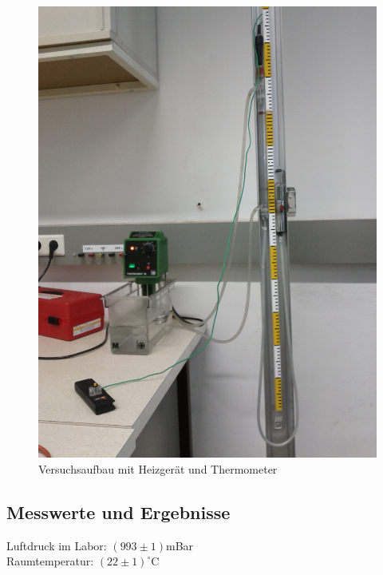 \documentclass[12pt,a4paper]{article}
\begin{document}
\begin{multicols}{2}
\begin{figure}[H]
	\centering
	\includegraphics[scale=0.22]{./figure/gas_therm_aufbau.png}
	\caption{Versuchsaufbau mit Heizgerät und Thermometer}
	\label{fig:gas_therm_aufbau}
\end{figure}


\subsection{Messwerte und Ergebnisse}
Luftdruck im Labor: $(993\pm 1)$mBar\\
Raumtemperatur: $(22 \pm 1)^\circ $C








\end{multicols}
\end{document}
